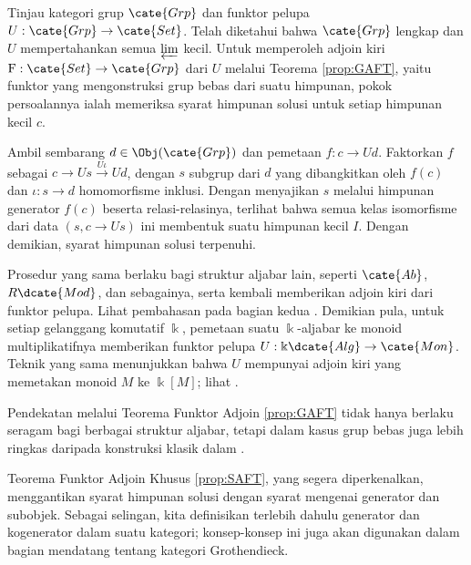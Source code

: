\begin{contoh}\label{eg:free-group-GAFT}
	Tinjau kategori grup $\cate{Grp}$ dan funktor pelupa
	$U:\cate{Grp}\to\cate{Set}$. Telah diketahui bahwa $\cate{Grp}$ lengkap
	dan $U$ mempertahankan semua $\varprojlim$ kecil. Untuk memperoleh adjoin
	kiri $\mathrm{F}:\cate{Set}\to\cate{Grp}$ dari $U$ melalui Teorema
	\ref{prop:GAFT}, yaitu funktor yang mengonstruksi grup bebas dari suatu
	himpunan, pokok persoalannya ialah memeriksa syarat himpunan solusi untuk
	setiap himpunan kecil $c$.

	Ambil sembarang $d\in\Obj(\cate{Grp})$ dan pemetaan $f:c\to Ud$.
	Faktorkan $f$ sebagai $c\to Us\xrightarrow{U\iota}Ud$, dengan $s$
	subgrup dari $d$ yang dibangkitkan oleh $f(c)$ dan $\iota:s\to d$
	homomorfisme inklusi. Dengan menyajikan $s$ melalui himpunan generator
	$f(c)$ beserta relasi-relasinya, terlihat bahwa semua kelas isomorfisme
	dari data $(s,c\to Us)$ ini membentuk suatu himpunan kecil $I$. Dengan
	demikian, syarat himpunan solusi terpenuhi.

	Prosedur yang sama berlaku bagi struktur aljabar lain, seperti
	$\cate{Ab}$, $R\dcate{Mod}$, dan sebagainya, serta kembali memberikan
	adjoin kiri dari funktor pelupa. Lihat pembahasan pada bagian kedua
	\cite[Bab V, \S 6]{ML98}. Demikian pula, untuk setiap gelanggang
	komutatif $\Bbbk$, pemetaan suatu $\Bbbk$-aljabar ke monoid
	multiplikatifnya memberikan funktor pelupa
	$U:\Bbbk\dcate{Alg}\to\cate{Mon}$. Teknik yang sama menunjukkan bahwa
	$U$ mempunyai adjoin kiri yang memetakan monoid $M$ ke $\Bbbk[M]$; lihat
	\cite[Definisi 5.6.1]{Li1}.

	Pendekatan melalui Teorema Funktor Adjoin \ref{prop:GAFT} tidak hanya
	berlaku seragam bagi berbagai struktur aljabar, tetapi dalam kasus grup
	bebas juga lebih ringkas daripada konstruksi klasik dalam
	\cite[\S 4.8]{Li1}.
\end{contoh}

Teorema Funktor Adjoin Khusus \ref{prop:SAFT}, yang segera diperkenalkan,
menggantikan syarat himpunan solusi dengan syarat mengenai generator dan
subobjek. Sebagai selingan, kita definisikan terlebih dahulu generator dan
kogenerator dalam suatu kategori; konsep-konsep ini juga akan digunakan dalam
bagian mendatang tentang kategori Grothendieck.

